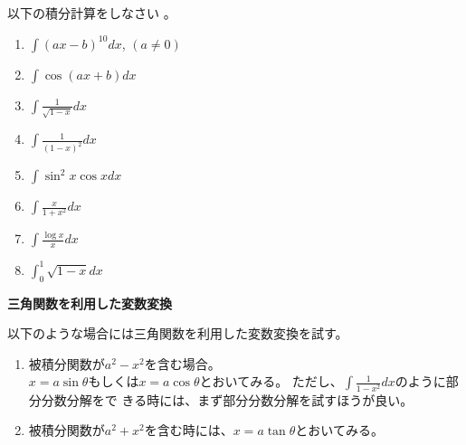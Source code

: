 \documentclass[twocolumn,11pt]{jarticle}
\begin{document}
\exercise
以下の積分計算をしなさい
。
\begin{enumerate}
\item \label{item:ax-b}$\displaystyle\int (a x-b)^{10}dx$, $(a\ne 0)$
\item \label{item:cos(ax+b)}$\displaystyle\int \cos(ax+b) dx$
\item \label{item:1/sqrt(1-x)}$\displaystyle\int \frac{1}{\sqrt{1-x}}dx$
\item \label{item:1/(1-x)2}$\displaystyle\int \frac{1}{(1-x)^2}dx$
\item \label{item:sin2xcosx-2}$\displaystyle\int\sin^2x\cos xdx$
\item \label{item:x/(1+x2)-2}$\displaystyle\int \frac{x}{1+x^2}dx$
\item \label{item:logx/x:2}$\displaystyle\int \frac{\log x}{x}dx$
\item \label{item:sqrt(1-x)}$\displaystyle\int_0^1 \sqrt{1-x} dx$
\end{enumerate}

\noindent
\textbf{三角関数を利用した変数変換}

以下のような場合には三角関数を利用した変数変換を試す。
\begin{enumerate}
\item 被積分関数が$a^2-x^2$を含む場合。\\
  $x=a\sin\theta$もしくは$x=a\cos\theta$とおいてみる。
  ただし、$\displaystyle\int\frac{1}{1-x^2}dx$のように部分分数分解をで
  きる時には、まず部分分数分解を試すほうが良い。
\item 被積分関数が$a^2+x^2$を含む時には、$x=a\tan\theta$とおいてみる。
\end{enumerate}
\end{document}
